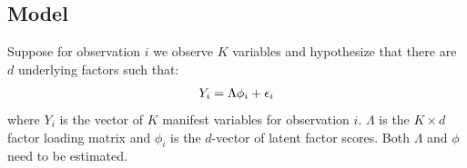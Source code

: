 \documentclass[letterpaper,10pt,english]{sphinxmanual}
\begin{document}
\subsection{Model}
\label{vignette:id79}
Suppose for observation \(i\) we observe \(K\) variables and
hypothesize that there are \(d\) underlying factors such that:
\begin{gather}
\begin{split}\begin{aligned}
Y_i = \Lambda \phi_i+\epsilon_i\end{aligned}\end{split}\notag
\end{gather}
where \(Y_{i}\) is the vector of \(K\) manifest variables for
observation \(i\). \(\Lambda\) is the \(K \times d\) factor
loading matrix and \(\phi_i\) is the \(d\)-vector of latent
factor scores. Both \(\Lambda\) and \(\phi\) need to be
estimated.
\end{document}
